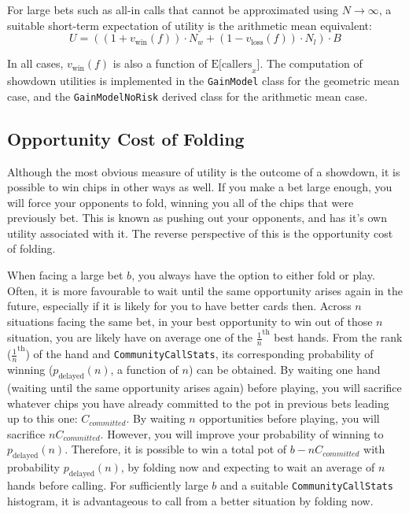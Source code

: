 For large bets such as all-in calls that cannot be approximated using $N \to \infty$, a suitable short-term expectation of utility is the arithmetic mean equivalent:
\[
U = \left( \left( 1 + v_{\mathrm{win}} \left( f \right) \right) \cdot N_w + \left( 1 - v_{\mathrm{loss}} \left( f \right) \right) \cdot N_l \right) \cdot B
\]

In all cases, $v_{\mathrm{win}} \left( f \right)$ is also a function of $\mathrm{E[callers}_x]$.
The computation of showdown utilities is implemented in the \texttt{GainModel} class for the geometric mean case, and the \texttt{GainModelNoRisk} derived class for the arithmetic mean case.



\subsection{Opportunity Cost of Folding}
\label{sec:FoldEquity}
Although the most obvious measure of utility is the outcome of a showdown, it is possible to win chips in other ways as well.
If you make a bet large enough, you will force your opponents to fold, winning you all of the chips that were previously bet.
This is known as pushing out your opponents, and has it's own utility associated with it.
The reverse perspective of this is the opportunity cost of folding.

When facing a large bet $b$, you always have the option to either fold or play.
Often, it is more favourable to wait until the same opportunity arises again in the future, especially if it is likely for you to have better cards then.
Across $n$ situations facing the same bet, in your best opportunity to win out of those $n$ situation, you are likely have on average one of the $\frac{1}{n}^{\mathrm{th}}$ best hands.
From the rank ($\frac{1}{n}^{\mathrm{th}}$) of the hand and \texttt{CommunityCallStats}, its corresponding probability of winning ($p_{\mathrm{delayed}}(n)$, a function of $n$) can be obtained.
By waiting one hand (waiting until the same opportunity arises again) before playing, you will sacrifice whatever chips you have already committed to the pot in previous bets leading up to this one: $C_{committed}$.
By waiting $n$ opportunities before playing, you will sacrifice $n C_{committed}$.
However, you will improve your probability of winning to $p_{\mathrm{delayed}}(n)$.
Therefore, it is possible to win a total pot of $b-n C_{committed}$ with probability $p_{\mathrm{delayed}}(n)$, by folding now and expecting to wait an average of $n$ hands before calling.
For sufficiently large $b$ and a suitable \texttt{CommunityCallStats} histogram, it is advantageous to call from a better situation by folding now.

